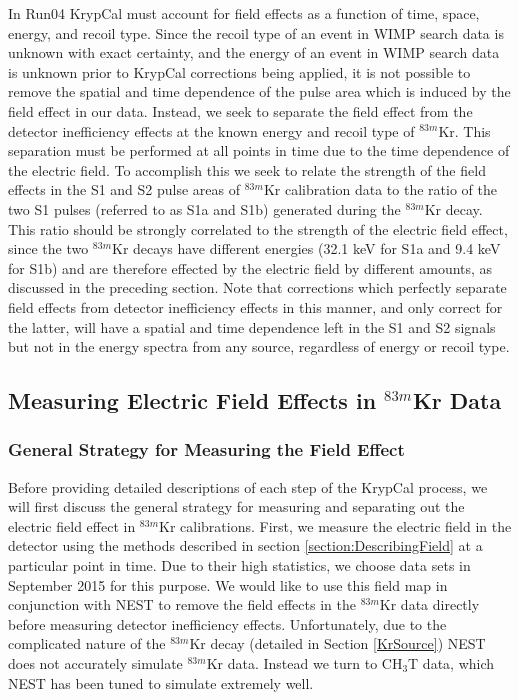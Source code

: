 \documentclass[a4paper,12pt]{article}
\begin{document}
{In Run04 KrypCal must account for field effects as a function of time, space, energy, and recoil type.  Since the recoil type of an event in WIMP search data is unknown with exact certainty, and the energy of an event in WIMP search data is unknown prior to KrypCal corrections being applied, it is not possible to remove the spatial and time dependence of the pulse area which is induced by the field effect in our data.  Instead, we seek to separate the field effect from the detector inefficiency effects at the known energy and recoil type of $^{83m}$Kr.  This separation must be performed at all points in time due to the time dependence of the electric field.  To accomplish this we seek to relate the strength of the field effects in the S1 and S2 pulse areas of $^{83m}$Kr calibration data to the ratio of the two S1 pulses (referred to as S1a and S1b) generated during the $^{83m}$Kr decay.  This ratio should be strongly correlated to the strength of the electric field effect, since the two $^{83m}$Kr decays have different energies (32.1 keV for S1a and 9.4 keV for S1b) and are therefore effected by the electric field by different amounts, as discussed in the preceding section.  Note that corrections which perfectly separate field effects from detector inefficiency effects in this manner, and only correct for the latter, will have a spatial and time dependence left in the S1 and S2 signals but not in the energy spectra from any source, regardless of energy or recoil type.

\subsection{Measuring Electric Field Effects in $^{83m}$Kr Data}

\subsubsection{General Strategy for Measuring the Field Effect} \label{section:GenStrat}
Before providing detailed descriptions of each step of the KrypCal process, we will first discuss the general strategy for measuring and separating out the electric field effect in $^{83m}$Kr calibrations.  First, we measure the electric field in the detector using the methods described in section \ref{section:DescribingField} at a particular point in time. Due to their high statistics, we choose data sets in September 2015 for this purpose. We would like to use this field map in conjunction with NEST to remove the field effects in the $^{83m}$Kr data directly before measuring detector inefficiency effects.  Unfortunately, due to the complicated nature of the $^{83m}$Kr decay (detailed in Section \ref{KrSource}) NEST does not accurately simulate $^{83m}$Kr data.  Instead we turn to CH$_3$T data, which NEST has been tuned to simulate extremely well.  

}
\end{document}
